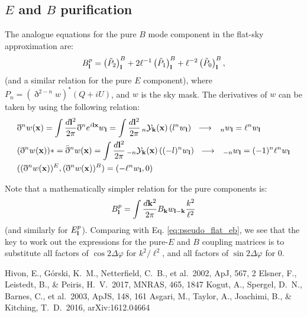 \documentclass[a4paper,10pt]{article}
\newcommand{\apj}{ApJ}
\newcommand{\apjs}{ApJS}
\newcommand{\mnras}{MNRAS}
\begin{document}
  \subsection{$E$ and $B$ purification}
    The analogue equations for the pure $B$ mode component in the flat-sky approximation are:
    \begin{equation}
      B^p_{\bf l}=\left(\tilde{P}_2\right)^B_{\bf l}+2\ell^{-1}\left(\tilde{P}_1\right)^B_{\bf l}+\ell^{-2}\left(\tilde{P}_0\right)^B_{\bf l},
    \end{equation}
    (and a similar relation for the pure $E$ component), where $P_n=(\eth^{2-n}w)^*(Q+iU)$, and $w$ is the sky mask. The derivatives of $w$
    can be taken by using the following relation:
    \begin{align}
      &\eth^nw({\bf x})=\int\frac{d{\bf l}^2}{2\pi}\eth^ne^{i{\bf l}{\bf x}}w_{\bf l}=\int\frac{d{\bf l}^2}{2\pi}\,_n{\cal Y}_{\bf k}({\bf x})\,(l^nw_{\bf l})\hspace{6pt}
      \longrightarrow\hspace{6pt}\,_nw_{\bf l}=\ell^nw_{\bf l}\\
      &(\eth^nw({\bf x}))*=\bar{\eth}^nw({\bf x})=\int\frac{d{\bf l}^2}{2\pi}\,_{-n}{\cal Y}_{\bf k}({\bf x})\,((-l)^nw_{\bf l})\hspace{6pt}
      \longrightarrow\hspace{6pt}\,_{-n}w_{\bf l}=(-1)^n\ell^nw_{\bf l}\\
      &((\eth^nw({\bf x}))^E,(\eth^nw({\bf x}))^B)=(-\ell^nw_{\bf l},0)
    \end{align}
    
    Note that a mathematically simpler relation for the pure components is:
    \begin{equation}
      B^p_{\bf l}=\int\frac{d{\bf k}^2}{2\pi}B_{\bf k}w_{{\bf l}-{\bf k}}\frac{k^2}{\ell^2}
    \end{equation}
    (and similarly for $E^p_{\bf l}$). Comparing with Eq. \ref{eq:pseudo_flat_eb}, we see that the key to work out the expressions for the pure-$E$ and $B$ coupling matrices is to substitute all factors of $\cos2\Delta\varphi$ for $k^2/\ell^2$, and all factors of $\sin2\Delta\varphi$ for 0.
    
\begin{thebibliography}{}
  Hivon, E., G{\'o}rski, K.~M., Netterfield, C.~B., et al.\ 2002, \apj, 567, 2 
  Elsner, F., Leistedt, B., \& Peiris, H.~V.\ 2017, \mnras, 465, 1847 
  Kogut, A., Spergel, D.~N., Barnes, C., et al.\ 2003, \apjs, 148, 161 
  Asgari, M., Taylor, A., Joachimi, B., \& Kitching, T.~D.\ 2016, arXiv:1612.04664 
\end{thebibliography}
\end{document}
